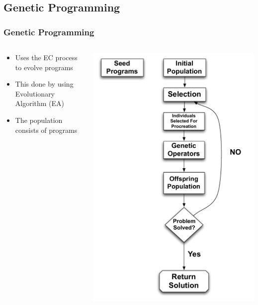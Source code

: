 \documentclass{beamer}
\begin{document}
\subsection[Genetic Programming]{Genetic Programming}
\begin{frame}
	\frametitle{Genetic Programming}
\begin{columns}[T]
\begin{column}{0.5\textwidth}
\begin{itemize}	
	\item Uses the EC process to evolve programs
	\item This done by using Evolutionary Algorithm (EA)
	\item The population consists of programs
	
\end{itemize}
\end{column}
\begin{column}{0.5\textwidth}
   \includegraphics[height=0.85\textheight]{Illustrations/GP1.pdf}
       \\
\end{column}
\end{columns}

\end{frame}
\end{document}
